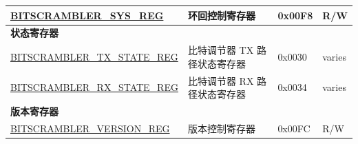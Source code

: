 \begin{longtable}{ | p{6.3cm} | p{7cm} | p{1.2cm} | p{1cm} | }
\hyperref[regdesc:BITSCRAMBLERSYSREG]{BITSCRAMBLER\_SYS\_REG} & 环回控制寄存器 & 0x00F8 & R/W \\ \hline
\multicolumn{4}{|l|}{\textbf{状态寄存器}} \\ \hline
\hyperref[regdesc:BITSCRAMBLERTXSTATEREG]{BITSCRAMBLER\_TX\_STATE\_REG} & 比特调节器 TX 路径状态寄存器 & 0x0030 & varies \\ \hline
\hyperref[regdesc:BITSCRAMBLERRXSTATEREG]{BITSCRAMBLER\_RX\_STATE\_REG} & 比特调节器 RX 路径状态寄存器 & 0x0034 & varies \\ \hline
\multicolumn{4}{|l|}{\textbf{版本寄存器}} \\ \hline
\hyperref[regdesc:BITSCRAMBLERVERSIONREG]{BITSCRAMBLER\_VERSION\_REG} & 版本控制寄存器 & 0x00FC & R/W \\ \hline
\end{longtable}
